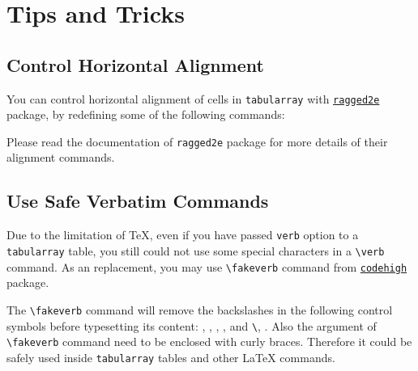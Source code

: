 \documentclass[oneside]{book}
\begin{document}
\chapter{Tips and Tricks}
\label{chap:tips}

\section{Control Horizontal Alignment}

You can control horizontal alignment of cells in \texttt{tabularray} with
\href{https://www.ctan.org/pkg/ragged2e}{\texttt{ragged2e}} package,
by redefining some of the following commands:

\begin{codehigh}
\RenewDocumentCommand\TblrAlignBoth{}{\justifying}
\RenewDocumentCommand\TblrAlignLeft{}{\RaggedRight}
\RenewDocumentCommand\TblrAlignCenter{}{\Centering}
\RenewDocumentCommand\TblrAlignRight{}{\RaggedLeft}
\end{codehigh}

Please read the documentation of \texttt{ragged2e} package for more details of
their alignment commands.

\section{Use Safe Verbatim Commands}%
\label{sec:fakeverb}

Due to the limitation of TeX, even if you have passed \texttt{verb} option to a
\texttt{tabularray} table, you still could not use some special characters in a
\verb!\verb! command. As an replacement, you may use \verb|\fakeverb| command from \href{https://www.ctan.org/pkg/codehigh}{\texttt{codehigh}} package.

The \verb|\fakeverb| command will remove the backslashes in the following control symbols before
typesetting its content: \fakeverb{\\\\}, \fakeverb{\\\{}, \fakeverb{\\\}}, \fakeverb{\\\#}, \fakeverb{\\\^} and \texttt{\textbackslash\textvisiblespace}, \fakeverb{\\\%}.
Also the argument of \verb|\fakeverb| command need to be enclosed with curly braces.
Therefore it could be safely used inside \verb|tabularray| tables and other LaTeX commands.
\end{document}
